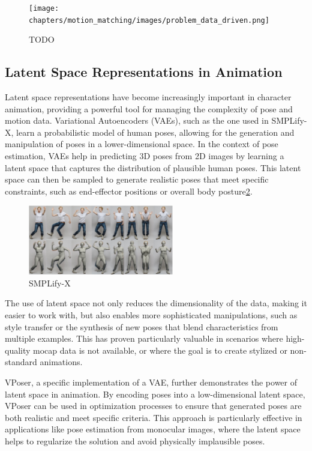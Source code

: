 \documentclass[../../main.tex]{subfiles}
\begin{document}
\begin{figure}
  \centering \texttt{[image: chapters/motion\_matching/images/problem\_data\_driven.png]}
  \caption{TODO}
  \label{fig:problem_data_driven}
\end{figure}

\subsection{Latent Space Representations in Animation}
\label{ch:motion_matching:related_work:latent_space}

Latent space representations have become increasingly important in character animation, providing a powerful tool for managing the complexity of pose and motion data. Variational Autoencoders (VAEs)\cite{TODO}, such as the one used in SMPLify-X\cite{TODO}, learn a probabilistic model of human poses, allowing for the generation and manipulation of poses in a lower-dimensional space. In the context of pose estimation, VAEs help in predicting 3D poses from 2D images by learning a latent space that captures the distribution of plausible human poses. This latent space can then be sampled to generate realistic poses that meet specific constraints, such as end-effector positions or overall body posture\ref{fig:simplifyx}.

\begin{figure}
  \centering \includegraphics[width = 2.5in]{chapters/motion_matching/images/simplifyx.png}
  \caption{SMPLify-X}
  \label{fig:simplifyx}
\end{figure}

The use of latent space not only reduces the dimensionality of the data, making it easier to work with, but also enables more sophisticated manipulations, such as style transfer or the synthesis of new poses that blend characteristics from multiple examples. This has proven particularly valuable in scenarios where high-quality mocap data is not available, or where the goal is to create stylized or non-standard animations.

VPoser\cite{TODO}, a specific implementation of a VAE, further demonstrates the power of latent space in animation. By encoding poses into a low-dimensional latent space, VPoser can be used in optimization processes to ensure that generated poses are both realistic and meet specific criteria. This approach is particularly effective in applications like pose estimation from monocular images, where the latent space helps to regularize the solution and avoid physically implausible poses.
\end{document}
